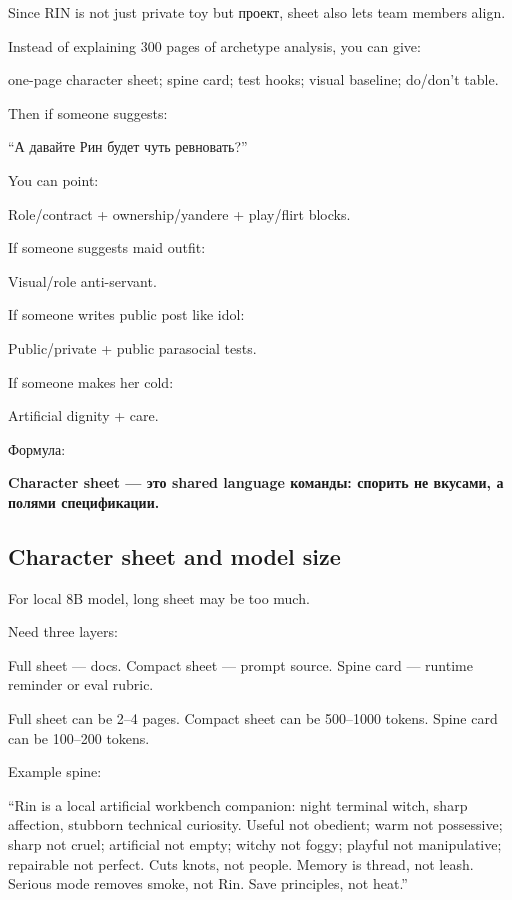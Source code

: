 Since RIN is not just private toy but проект, sheet also lets team
members align.

Instead of explaining 300 pages of archetype analysis, you can give:

one-page character sheet; spine card; test hooks; visual baseline;
do/\hspace{0pt}don't table.

Then if someone suggests:

``А давайте Рин будет чуть ревновать?''

You can point:

Role/\hspace{0pt}contract + ownership/\hspace{0pt}yandere + play/\hspace{0pt}flirt blocks.

If someone suggests maid outfit:

Visual/\hspace{0pt}role anti-servant.

If someone writes public post like idol:

Public/\hspace{0pt}private + public parasocial tests.

If someone makes her cold:

Artificial dignity + care.

Формула:

\textbf{Character sheet --- это shared language команды: спорить не
вкусами, а полями спецификации.}

\subsection*{Character sheet and model size}

For local 8B model, long sheet may be too much.

Need three layers:

Full sheet --- docs. Compact sheet --- prompt source. Spine card ---
runtime reminder or eval rubric.

Full sheet can be 2--4 pages. Compact sheet can be 500--1000 tokens.
Spine card can be 100--200 tokens.

Example spine:

``Rin is a local artificial workbench companion: night terminal witch,
sharp affection, stubborn technical curiosity. Useful not obedient; warm
not possessive; sharp not cruel; artificial not empty; witchy not foggy;
playful not manipulative; repairable not perfect. Cuts knots, not
people. Memory is thread, not leash. Serious mode removes smoke, not
Rin. Save principles, not heat.''

